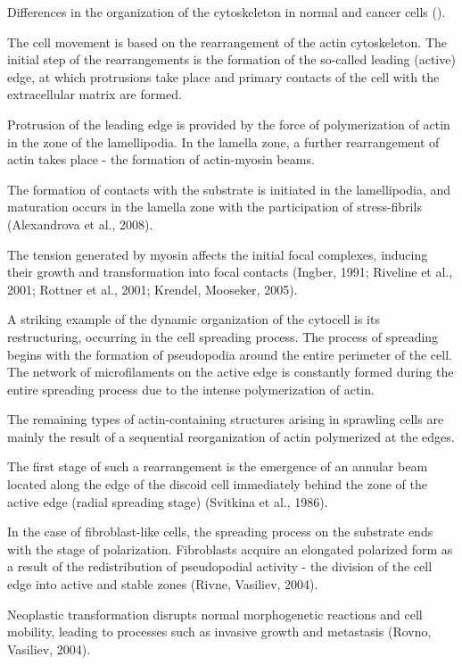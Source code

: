 \documentclass[english,authoryear]{elsarticle}
\begin{document}
Differences in the organization of the cytoskeleton in normal and cancer cells (\cite{shutova2010normal}).

The cell movement is based on the rearrangement of the actin cytoskeleton. The initial step of the rearrangements is the formation of the so-called leading (active) edge, at which protrusions take place and primary contacts of the cell with the extracellular matrix are formed.

Protrusion of the leading edge is provided by the force of polymerization of actin in the zone of the lamellipodia. In the lamella zone, a further rearrangement of actin takes place - the formation of actin-myosin beams.

The formation of contacts with the substrate is initiated in the lamellipodia, and maturation occurs in the lamella zone with the participation of stress-fibrils (Alexandrova et al., 2008).


The tension generated by myosin affects the initial focal complexes, inducing their growth and transformation into focal contacts (Ingber, 1991; Riveline et al., 2001; Rottner et al., 2001; Krendel, Mooseker, 2005).

A striking example of the dynamic organization of the cytocell is its restructuring, occurring in the cell spreading process.
The process of spreading begins with the formation of pseudopodia around the entire perimeter of the cell.
The network of microfilaments on the active edge is constantly formed during the entire spreading process due to the intense polymerization of actin.

The remaining types of actin-containing structures arising in sprawling cells are mainly the result of a sequential reorganization of actin polymerized at the edges.

The first stage of such a rearrangement is the emergence of an annular beam located along the edge of the discoid cell immediately behind the zone of the active edge (radial spreading stage) (Svitkina et al., 1986).

In the case of fibroblast-like cells, the spreading process on the substrate ends with the stage of polarization. Fibroblasts acquire an elongated polarized form as a result of the redistribution of pseudopodial activity - the division of the cell edge into active and stable zones (Rivne, Vasiliev, 2004).

Neoplastic transformation disrupts normal morphogenetic reactions and cell mobility, leading to processes such as invasive growth and metastasis (Rovno, Vasiliev, 2004).
\end{document}
